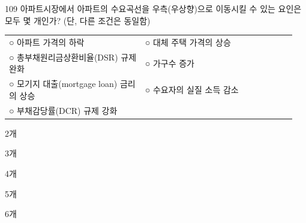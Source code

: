 \begin{question}{109}
아파트시장에서 아파트의 수요곡선을 우측(우상향)으로 이동시킬 수 있는 요인은 모두 몇 개인가? (단, 다른 조건은 동일함)
\begin{framedtext}
\begin{tabular}{@{}p{0.45\linewidth}p{0.5\linewidth}@{}}
○ 아파트 가격의 하락 & ○ 대체 주택 가격의 상승 \\
○ 총부채원리금상환비율(DSR) 규제 완화 & ○ 가구수 증가 \\
○ 모기지 대출(mortgage loan) 금리의 상승 & ○ 수요자의 실질 소득 감소 \\
○ 부채감당률(DCR) 규제 강화 \\
\end{tabular}
\end{framedtext}
\begin{choices}
  \item 2개
  \item 3개
  \item 4개
  \item 5개
  \item 6개
\end{choices}
\end{question}
